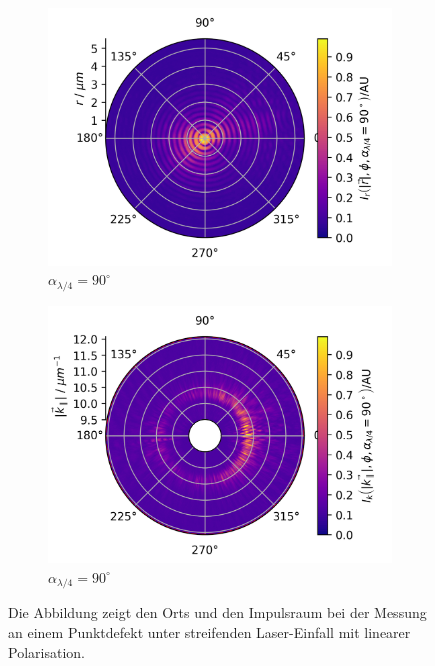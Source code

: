 \documentclass[a4paper, titlepage,  ngerman, fullpage]{book}
\begin{document}
\begin{figure}
\begin{subfigure}{0.49\textwidth}
		\includegraphics[width=\textwidth]{figures/new/B_2_fp_90.png}
		\caption{$\alpha_{\lambda/4} = 90^\circ$}
	\end{subfigure}
	\begin{subfigure}{0.5\textwidth}
		\centering
		\includegraphics[width=\textwidth]{figures/new/B_2_bfp_90.png}
		\caption{$\alpha_{\lambda/4} = 90^\circ$}
	\end{subfigure}

	\caption[Orts- und Impulsraum Rohdaten bei linearer Polarisation]{Die Abbildung zeigt den Orts und den Impulsraum bei der Messung an einem Punktdefekt unter streifenden Laser-Einfall mit linearer Polarisation.}			
\end{figure}
\end{document}

